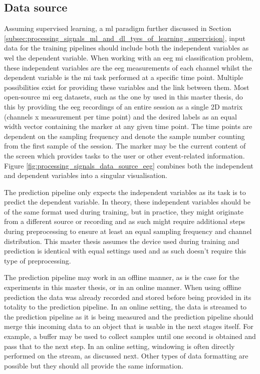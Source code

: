 
\subsection{Data source}
\label{subsec:processing_signals_general_pipeline_data_acquisition}


Assuming supervised learning, a \gls{ml} paradigm further discussed in Section \ref{subsec:processing_signals_ml_and_dl_tyes_of_learning_supervision}, input data for the training pipelines should include both the independent variables as wel the dependent variable.
When working with an \gls{eeg} \gls{mi} classification problem, these independent variables are the \gls{eeg} measurements of each channel whilst the dependent variable is the \gls{mi} task performed at a specific time point.
Multiple possibilities exist for providing these variables and the link between them.
Most open-source \gls{mi} \gls{eeg} datasets, such as the one by \citet{eeg_data} used in this master thesis, do this by providing the \gls{eeg} recordings of an entire session as a single 2D matrix (channels x measurement per time point) and the desired labels as an equal width vector containing the marker at any given time point.
The time points are dependent on the sampling frequency and denote the sample number counting from the first sample of the session.
The marker may be the current content of the screen which provides tasks to the user or other event-related information.
Figure \ref{fig:processing_signals_data_source_eeg} combines both the independent and dependent variables into a singular visualisation.

The prediction pipeline only expects the independent variables as its task is to predict the dependent variable.
In theory, these independent variables should be of the same format used during training, but in practice, they might originate from a different source or recording and as such might require additional steps during preprocessing to ensure at least an equal sampling frequency and channel distribution.
This master thesis assumes the device used during training and prediction is identical with equal settings used and as such doesn't require this type of preprocessing.

The prediction pipeline may work in an offline manner, as is the case for the experiments in this master thesis, or in an online manner.
When using offline prediction the data was already recorded and stored before being provided in its totality to the prediction pipeline.
In an online setting, the data is streamed to the prediction pipeline as it is being measured and the prediction pipeline should merge this incoming data to an object that is usable in the next stages itself.
For example, a buffer may be used to collect samples until one second is obtained and pass that to the next step.
In an online setting, windowing is often directly performed on the stream, as discussed next.
Other types of data formatting are possible but they should all provide the same information.

